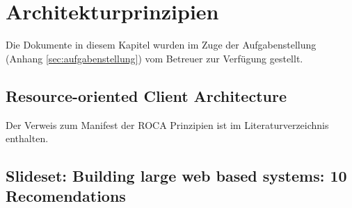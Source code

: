 \chapter{Architekturprinzipien}

Die Dokumente in diesem Kapitel wurden im Zuge der Aufgabenstellung (Anhang \ref{sec:aufgabenstellung}) vom Betreuer zur Verfügung gestellt.

\section{Resource-oriented Client Architecture}
Der Verweis zum Manifest der ROCA Prinzipien \cite{ROCA} ist im Literaturverzeichnis enthalten.

\section{Slideset: Building large web based systems: 10 Recomendations}

